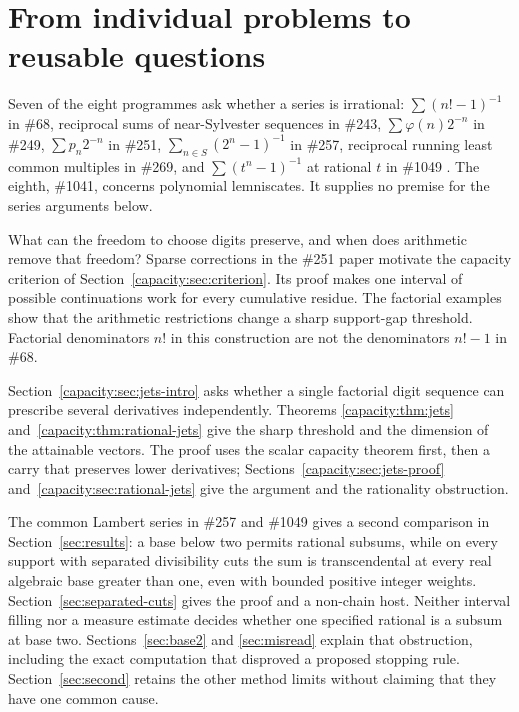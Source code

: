 \documentclass[11pt]{article}
\begin{document}
\section{From individual problems to reusable questions}\label{sec:map}
Seven of the eight programmes ask whether a series is irrational:
$\sum(n!-1)^{-1}$ in \#68, reciprocal sums of near-Sylvester sequences in
\#243, $\sum\varphi(n)2^{-n}$ in \#249, $\sum p_n2^{-n}$ in \#251,
$\sum_{n\in S}(2^n-1)^{-1}$ in \#257, reciprocal running least common
multiples in \#269, and $\sum(t^n-1)^{-1}$ at rational $t$ in \#1049
\cite{erdosgraham1980,erdos1988}. The eighth, \#1041, concerns polynomial
lemniscates. It supplies no premise for the series arguments below.

What can the freedom to choose digits preserve, and when does arithmetic
remove that freedom? Sparse corrections in the \#251 paper motivate the
capacity criterion of Section~\ref{capacity:sec:criterion}. Its proof makes
one interval of possible continuations work for every cumulative residue.
The factorial examples show that the arithmetic restrictions change a sharp
support-gap threshold. Factorial denominators $n!$ in this construction are
not the denominators $n!-1$ in \#68.

Section~\ref{capacity:sec:jets-intro} asks whether a single factorial digit
sequence can prescribe several derivatives independently. Theorems
\ref{capacity:thm:jets} and~\ref{capacity:thm:rational-jets} give the sharp
threshold and the dimension of the attainable vectors. The proof uses the
scalar capacity theorem first, then a carry that preserves lower derivatives;
Sections~\ref{capacity:sec:jets-proof} and~\ref{capacity:sec:rational-jets}
give the argument and the rationality obstruction.

The common Lambert series in \#257 and \#1049 gives a second comparison in
Section~\ref{sec:results}: a base below two permits rational subsums, while
on every support with separated divisibility cuts the sum is transcendental
at every real algebraic base greater than one, even with bounded positive
integer weights. Section~\ref{sec:separated-cuts} gives the proof and a
non-chain host. Neither
interval filling nor a measure estimate decides whether one specified
rational is a subsum at base two. Sections~\ref{sec:base2} and
\ref{sec:misread} explain that obstruction, including the exact computation
that disproved a proposed stopping rule. Section~\ref{sec:second} retains the
other method limits without claiming that they have one common cause.
\end{document}
